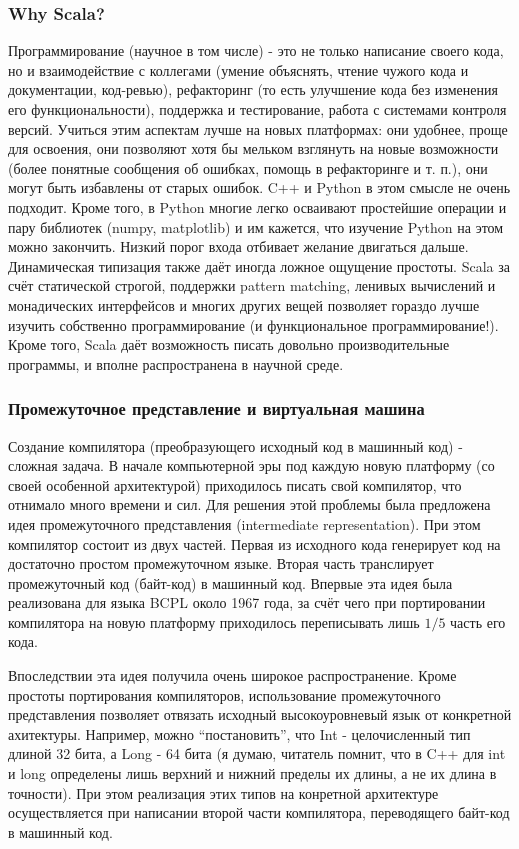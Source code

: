 \documentclass{book}
\begin{document}
\subsubsection{Why Scala?}

Программирование (научное в том числе) - это не только написание своего кода, но и взаимодействие с
коллегами (умение объяснять, чтение чужого кода и документации, код-ревью), рефакторинг (то есть
улучшение кода без изменения его функциональности), поддержка и тестирование, работа с системами
контроля версий. Учиться этим аспектам лучше на новых платформах: они удобнее, проще для освоения,
они позволяют хотя бы мельком взглянуть на новые возможности (более понятные сообщения об ошибках,
помощь в рефакторинге и т.  п.), они могут быть избавлены от старых ошибок. C++ и Python в этом
смысле не очень подходит.  Кроме того, в Python многие легко осваивают простейшие операции и пару
библиотек (numpy, matplotlib) и им кажется, что изучение Python на этом можно закончить. Низкий
порог входа отбивает желание двигаться дальше. Динамическая типизация также даёт иногда ложное
ощущение простоты.  Scala за счёт статической строгой, поддержки pattern matching, ленивых
вычислений и монадических интерфейсов и многих других вещей позволяет гораздо лучше изучить
собственно программирование (и функциональное программирование!).  Кроме того, Scala даёт
возможность писать довольно производительные программы, и вполне распространена в научной среде.

\subsubsection{Промежуточное представление и виртуальная машина}

Создание компилятора (преобразующего исходный код в машинный код) - сложная задача. В начале
компьютерной эры под каждую новую платформу (со своей особенной архитектурой) приходилось писать
свой компилятор, что отнимало много времени и сил. Для решения этой проблемы была предложена идея
промежуточного представления (intermediate representation). При этом компилятор состоит из двух
частей. Первая из исходного кода генерирует код на достаточно простом промежуточном языке. Вторая
часть транслирует промежуточный код (байт-код) в машинный код. Впервые эта идея была реализована
для языка BCPL около 1967 года, за счёт чего при портировании компилятора на новую платформу
приходилось переписывать лишь $1/5$ часть его кода.

Впоследствии эта идея получила очень широкое распространение. Кроме простоты портирования
компиляторов, использование промежуточного представления позволяет отвязать исходный
высокоуровневый язык от конкретной ахитектуры. Например, можно ``постановить'', что Int -
целочисленный тип длиной 32 бита, а Long - 64 бита (я думаю, читатель помнит, что в C++ для int и
long определены лишь верхний и нижний пределы их длины, а не их длина в точности). При этом
реализация этих типов на конретной архитектуре осуществляется при написании второй части
компилятора, переводящего байт-код в машинный код.
\end{document}
